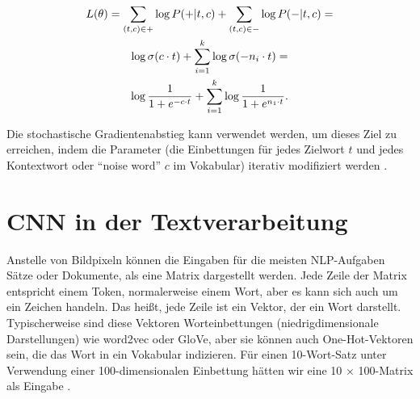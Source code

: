 \begin{gather} \label{Formel3_5}
    L(\theta) = \sum_{(t,c)\in +}\log P(+|t,c)+\sum_{(t,c)\in -} \log P(-|t,c) =  \notag\\
    \log \sigma(c \cdot t)+\sum^{k}_{i=1}\log \sigma(-n_{i} \cdot t) = \notag\\
    \log \frac{1}{1+e^{-c \cdot t}}+\sum^{k}_{i=1}\log\frac{1}{1+e^{n_{1} \cdot t}}.
\end{gather}

Die stochastische Gradientenabstieg kann verwendet werden, um dieses Ziel zu erreichen, indem die Parameter (die Einbettungen für jedes Zielwort $t$ und jedes Kontextwort oder \enquote{noise word} $c$ im Vokabular) iterativ modifiziert werden \cite*[114]{Jurafskya}.


\section{CNN in der Textverarbeitung}
Anstelle von Bildpixeln können die Eingaben für die meisten NLP-Aufgaben Sätze oder Dokumente, als eine Matrix dargestellt werden. Jede Zeile der Matrix entspricht einem Token, normalerweise einem Wort, aber es kann sich auch um ein Zeichen handeln. Das heißt, jede Zeile ist ein Vektor, der ein Wort darstellt. Typischerweise sind diese Vektoren Worteinbettungen (niedrigdimensionale Darstellungen) wie word2vec oder GloVe, aber sie können auch One-Hot-Vektoren sein, die das Wort in ein Vokabular indizieren. Für einen 10-Wort-Satz unter Verwendung einer 100-dimensionalen Einbettung hätten wir eine 10 × 100-Matrix als Eingabe \cite*{Zhang}.

